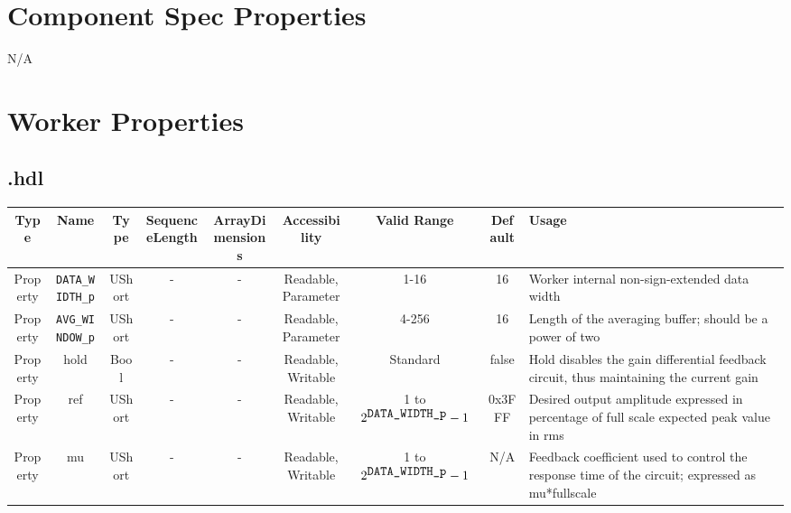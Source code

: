\begin{landscape}
\section*{Component Spec Properties}
	N/A

\section*{Worker Properties}
\subsection*{\comp.hdl}
\begin{scriptsize}
	\begin{tabular}{|c|c|c|c|c|c|c|c|p{6.9cm}|}
		\hline
		\rowcolor{blue}
		Type     & Name                & Type   & SequenceLength & ArrayDimensions & Accessibility       & Valid Range & Default & Usage                                        \\
		\hline
		Property & \verb+DATA_WIDTH_p+ & UShort & -              & -               & Readable, Parameter & 1-16        & 16      & Worker internal non-sign-extended data width \\
		\hline
		Property & \verb+AVG_WINDOW_p+ & UShort & -              & -               & Readable, Parameter & 4-256       & 16      & Length of the averaging buffer; should be a power of two \\
		\hline
		Property & hold                & Bool   & -              & -               & Readable, Writable  & Standard    & false   & Hold disables the gain differential feedback circuit, thus maintaining the current gain \\
		\hline
		Property & ref                 & UShort & -              & -               & Readable, Writable  & 1 to $2^{\verb+DATA_WIDTH_p+}-1$ & 0x3FFF & Desired output amplitude expressed in percentage of full scale expected peak value in rms \\
		\hline
		Property & mu                  & UShort & -              & -               & Readable, Writable  & 1 to $2^{\verb+DATA_WIDTH_p+}-1$ & N/A & Feedback coefficient used to control the response time of the circuit; expressed as mu*fullscale \\
		\hline
	\end{tabular}
\end{scriptsize}


\end{landscape}
